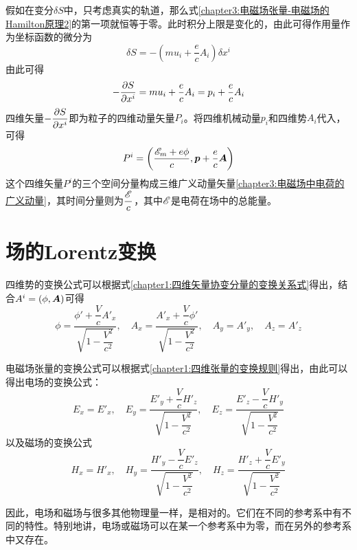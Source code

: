 假如在变分$\delta S$中，只考虑真实的轨道，那么式\eqref{chapter3:电磁场张量-电磁场的Hamilton原理2}的第一项就恒等于零。此时积分上限是变化的，由此可得作用量作为坐标函数的微分为
\begin{equation}
	\delta S = -\left(mu_i+\frac{e}{c}A_i\right)\delta x^i
	\label{chapter3:作用量对坐标的微分}
\end{equation}
由此可得
\begin{equation}
	-\frac{\partial S}{\partial x^i} = mu_i + \frac{e}{c}A_i = p_i+\frac{e}{c}A_i
	\label{chapter3:电磁场中电荷的四维动量}
\end{equation}
四维矢量$-\dfrac{\partial S}{\partial x^i}$即为粒子的四维动量矢量$P_i$。将四维机械动量$p_i$和四维势$A_i$代入，可得
\begin{equation}
	P^i = \left(\frac{\mathscr{E}_m+e\phi}{c},\boldsymbol{p} +\frac{e}{c}\boldsymbol{A}\right)
	\label{chapter3:电磁场中电荷的四维动量矢量}
\end{equation}
这个四维矢量$P^i$的三个空间分量构成三维广义动量矢量\eqref{chapter3:电磁场中电荷的广义动量}，其时间分量则为$\dfrac{\mathscr{E}}{c}$，其中$\mathscr{E}$是电荷在场中的总能量。

\section{场的Lorentz变换}

四维势的变换公式可以根据式\eqref{chapter1:四维矢量协变分量的变换关系式}得出，结合$A^i = (\phi,\boldsymbol{A})$可得
\begin{equation}
	\phi = \frac{\phi'+\dfrac{V}{c}A'_x}{\sqrt{1-\dfrac{V^2}{c^2}}},\quad
	A_x = \frac{A'_x+\dfrac{V}{c}\phi'}{\sqrt{1-\dfrac{V^2}{c^2}}},\quad
	A_y = A'_y,\quad A_z = A'_z
\label{chapter3:四维势的变换}
\end{equation}

电磁场张量的变换公式可以根据式\eqref{chapter1:四维张量的变换规则}得出，由此可以得出电场的变换公式：
\begin{equation}
	E_x = E'_x,\quad E_y = \frac{E'_y+\dfrac{V}{c}H'_z}{\sqrt{1-\dfrac{V^2}{c^2}}},\quad E_z = \frac{E'_z-\dfrac{V}{c}H'_y}{\sqrt{1-\dfrac{V^2}{c^2}}}
	\label{chapter3:电场的变换}
\end{equation}
以及磁场的变换公式
\begin{equation}
	H_x = H'_x,\quad H_y = \frac{H'_y-\dfrac{V}{c}E'_z}{\sqrt{1-\dfrac{V^2}{c^2}}},\quad H_z = \frac{H'_z+\dfrac{V}{c}E'_y}{\sqrt{1-\dfrac{V^2}{c^2}}}
	\label{chapter3:磁场的变换}
\end{equation}

因此，电场和磁场与很多其他物理量一样，是相对的。它们在不同的参考系中有不同的特性。特别地讲，电场或磁场可以在某一个参考系中为零，而在另外的参考系中又存在。

